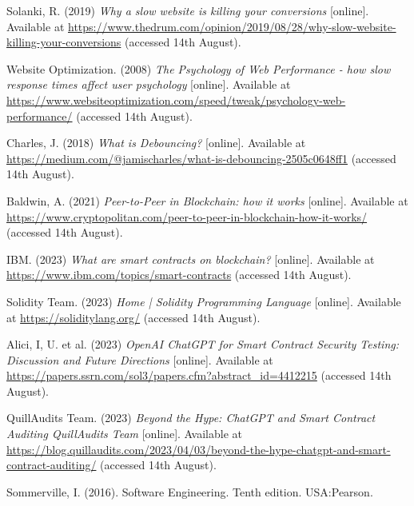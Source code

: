  \noindent [24] Solanki, R. (2019) \textit{Why a slow website is killing your conversions} [online]. Available at \url{https://www.thedrum.com/opinion/2019/08/28/why-slow-website-killing-your-conversions} (accessed 14th August).
 \vspace{0.2cm}

 \noindent [25] Website Optimization. (2008) \textit{The Psychology of Web Performance - how slow response times affect user psychology} [online]. Available at \url{https://www.websiteoptimization.com/speed/tweak/psychology-web-performance/} (accessed 14th August).
 \vspace{0.2cm}

 \noindent [26] Charles, J. (2018) \textit{What is Debouncing?} [online]. Available at \url{https://medium.com/@jamischarles/what-is-debouncing-2505c0648ff1} (accessed 14th August).
 \vspace{0.2cm}

 \noindent [27] Baldwin, A. (2021) \textit{Peer-to-Peer in Blockchain: how it works} [online]. Available at \url{https://www.cryptopolitan.com/peer-to-peer-in-blockchain-how-it-works/} (accessed 14th August).
 \vspace{0.2cm}

 \noindent [28] IBM. (2023) \textit{What are smart contracts on blockchain?} [online]. Available at \url{https://www.ibm.com/topics/smart-contracts} (accessed 14th August).
 \vspace{0.2cm}

 \noindent [29] Solidity Team. (2023) \textit{Home | Solidity Programming Language} [online]. Available at \url{https://soliditylang.org/} (accessed 14th August).
 \vspace{0.2cm}

 \noindent [30] Alici, I, U. et al. (2023) \textit{OpenAI ChatGPT for Smart Contract Security Testing: Discussion and Future Directions} [online]. Available at \url{https://papers.ssrn.com/sol3/papers.cfm?abstract_id=4412215} (accessed 14th August).
 \vspace{0.2cm}

 \noindent [31] QuillAudits Team. (2023) \textit{Beyond the Hype: ChatGPT and Smart Contract Auditing QuillAudits Team} [online]. Available at \url{https://blog.quillaudits.com/2023/04/03/beyond-the-hype-chatgpt-and-smart-contract-auditing/} (accessed 14th August).
 \vspace{0.2cm}

 \noindent [TODO] Sommerville, I. (2016). Software Engineering. Tenth edition. USA:Pearson.
 \vspace{0.2cm}
 
\newpage

